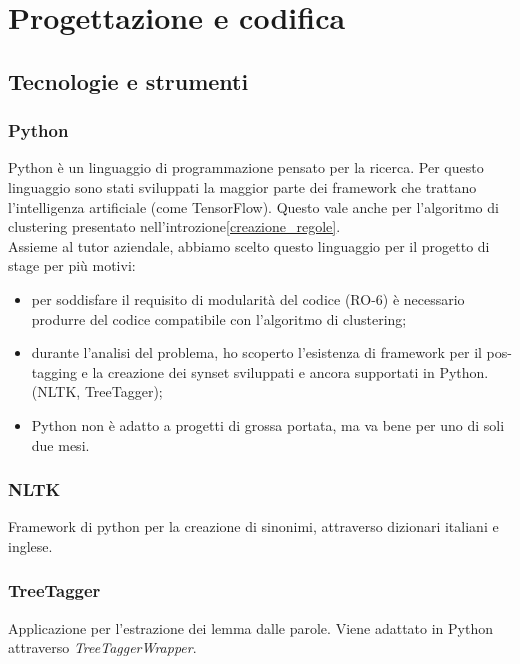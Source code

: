 
\chapter{Progettazione e codifica}
\label{cap:progettazione-codifica}

\section{Tecnologie e strumenti}
\label{sec:tecnologie-strumenti}
\subsection*{Python}
Python è un linguaggio di programmazione pensato per la ricerca. Per questo linguaggio sono stati sviluppati la maggior parte dei framework che trattano l'intelligenza artificiale (come TensorFlow). Questo vale anche per l'algoritmo di clustering presentato nell'introzione\ref{creazione_regole}.\\
Assieme al tutor aziendale, abbiamo scelto questo linguaggio per il progetto di stage per più motivi:
\begin{itemize}
    \item per soddisfare il requisito di modularità del codice (RO-6) è necessario produrre del codice compatibile con l'algoritmo di clustering;
    \item durante l'analisi del problema, ho scoperto l'esistenza di framework per il pos-tagging e la creazione dei synset sviluppati e ancora supportati in Python. (NLTK, TreeTagger);
    \item Python non è adatto a progetti di grossa portata, ma va bene per uno di soli due mesi.
\end{itemize}


\subsection*{NLTK}
Framework di python per la creazione di sinonimi, attraverso dizionari italiani e inglese.

\subsection*{TreeTagger}
Applicazione per l'estrazione dei lemma dalle parole. Viene adattato in Python attraverso \textit{TreeTaggerWrapper}.


